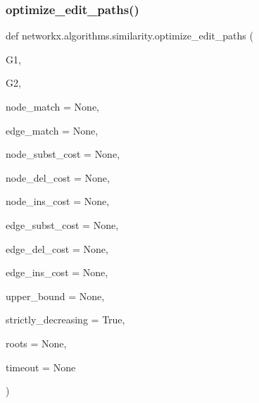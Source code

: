 \subsubsection{\texorpdfstring{optimize\+\_\+edit\+\_\+paths()}{optimize\_edit\_paths()}}
{\footnotesize\ttfamily def networkx.\+algorithms.\+similarity.\+optimize\+\_\+edit\+\_\+paths (\begin{DoxyParamCaption}\item[{}]{G1,  }\item[{}]{G2,  }\item[{}]{node\+\_\+match = {\ttfamily None},  }\item[{}]{edge\+\_\+match = {\ttfamily None},  }\item[{}]{node\+\_\+subst\+\_\+cost = {\ttfamily None},  }\item[{}]{node\+\_\+del\+\_\+cost = {\ttfamily None},  }\item[{}]{node\+\_\+ins\+\_\+cost = {\ttfamily None},  }\item[{}]{edge\+\_\+subst\+\_\+cost = {\ttfamily None},  }\item[{}]{edge\+\_\+del\+\_\+cost = {\ttfamily None},  }\item[{}]{edge\+\_\+ins\+\_\+cost = {\ttfamily None},  }\item[{}]{upper\+\_\+bound = {\ttfamily None},  }\item[{}]{strictly\+\_\+decreasing = {\ttfamily True},  }\item[{}]{roots = {\ttfamily None},  }\item[{}]{timeout = {\ttfamily None} }\end{DoxyParamCaption})}

